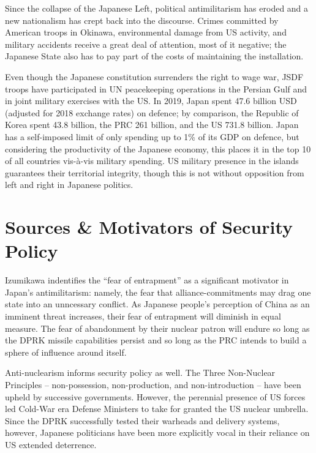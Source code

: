 \documentclass[letterpaper,12pt,twoside]{article} %
\begin{document}
\begin{multicols}{2}
Since the collapse of the Japanese Left, political antimilitarism has eroded and a new nationalism has crept back into the discourse. Crimes committed by American troops in Okinawa, environmental damage from US activity, and military accidents receive a great deal of attention, most of it negative; the Japanese State also has to pay part of the costs of maintaining the installation.

Even though the Japanese constitution surrenders the right to wage war, JSDF troops have participated in UN peacekeeping operations in the Persian Gulf and in joint military exercises with the US. In 2019, Japan spent 47.6 billion USD (adjusted for 2018 exchange rates) on defence; by comparison, the Republic of Korea spent 43.8 billion, the PRC 261 billion, and the US 731.8 billion.\autocite{stockholmreport} Japan has a self-imposed limit of only spending up to 1\% of its GDP on defence, but considering the productivity of the Japanese economy, this places it in the top 10 of all countries vis-à-vis military spending. US military presence in the islands guarantees their territorial integrity, though this is not without opposition from left and right in Japanese politics.

\section{Sources \& Motivators of Security Policy}

Izumikawa indentifies the ``fear of entrapment'' as a significant motivator in Japan's antimilitarism:\autocite[125]{izumikawa2010antimilitarism} namely, the fear that alliance-commitments may drag one state into an unncessary conflict. As Japanese people's perception of China as an imminent threat increases, their
fear of entrapment will diminish in equal measure.\autocite[Chapter 3]{smith2019rearmed} The fear of abandonment by their nuclear patron will endure so long as the DPRK missile capabilities persist and so long as the PRC intends to build a sphere of influence around itself.

Anti-nuclearism informs security policy as well. The Three Non-Nuclear Principles -- non-possession, non-production, and non-introduction -- have been upheld by successive governments. However, the perennial presence of US forces led Cold-War era Defense Ministers to take for granted the US nuclear umbrella. Since the DPRK successfully tested their warheads and delivery systems, however, Japanese politicians have been more explicitly vocal in their reliance on US extended deterrence.


\end{multicols}
\end{document}
